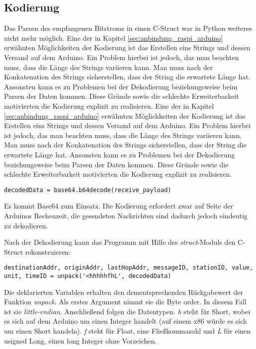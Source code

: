 \cite{sparkfun}   

\subsection{Kodierung}
\label{sec:kodierung}
Das Parsen des empfangenen Bitstroms in einen C-Struct war in Python weiteres nicht mehr möglich. 
Eine der in Kapitel \ref{sec:anbindung_raspi_arduino} erwähnten Möglichkeiten der Kodierung ist das Erstellen eins Strings und dessen Versand auf dem Arduino. Ein Problem hierbei ist jedoch, das man beachten muss, dass die Länge des Strings variieren kann. Man muss nach der Konkatenation des Strings sicherstellen, dass der String die erwartete Länge hat. Ansonsten kann es zu Problemen bei der Dekodierung beziehungsweise beim Parsen der Daten kommen. Diese Gründe sowie die schlechte Erweiterbarkeit motivierten die Kodierung explizit zu realisieren. 
Eine der in Kapitel \ref{sec:anbindung_raspi_arduino} erwähnten Möglichkeiten der Kodierung ist das Erstellen eins Strings und dessen Versand auf dem Arduino. Ein Problem hierbei ist jedoch, das man beachten muss, dass die Länge des Strings variieren kann. Man muss nach der Konkatenation des Strings sicherstellen, dass der String die erwartete Länge hat. Ansonsten kann es zu Problemen bei der Dekodierung beziehungsweise beim Parsen der Daten kommen. Diese Gründe sowie die schlechte Erweiterbarkeit motivierten die Kodierung explizit zu realisieren. 

\lstset{language=python, numbers=none}
\begin{lstlisting}
decodedData = base64.b64decode(receive_payload)
\end{lstlisting}
Es kommt Base64 zum Einsatz. Die Kodierung erfordert zwar auf Seite der Arduinos Rechenzeit, die gesendeten Nachrichten sind dadurch jedoch eindeutig zu dekodieren. 

Nach der Dekodierung kann das Programm mit Hilfe des \textit{struct}-Moduls den C-Struct rekonstruieren:  
\lstset{language=python, numbers=none, breaklines=true}
\begin{lstlisting}
destinationAddr, originAddr, lastHopAddr, messageID, stationID, value, unit, timeID = unpack('<hhhhhfhL', decodedData)
\end{lstlisting}
Die deklarierten Variablen erhalten den dementsprechenden Rückgabewert der Funktion \textit{unpack}. Als erstes Argument nimmt sie die Byte order. In diesem Fall ist sie \textit{little-endian}. Anschließend folgen die Datentypen. \textit{h} steht für Short, wobei es sich auf dem Arduino um einen Integer handelt (auf einem x86 würde es sich um einen Short handeln). \textit{f} steht für Float, eine Fließkommazahl und \textit{L} für einen usigned Long, einen long Integer ohne Vorzeichen. 

